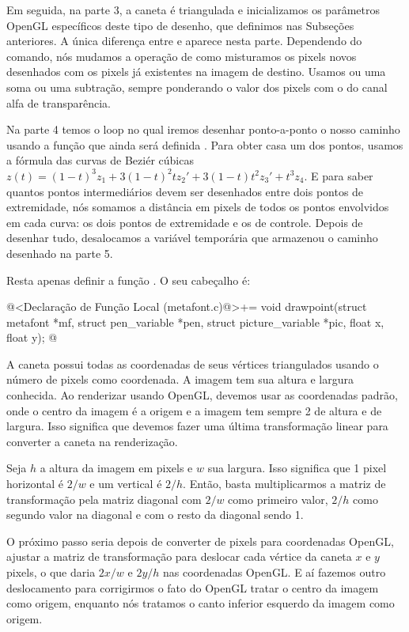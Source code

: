 {Em seguida, na parte 3, a caneta é triangulada e inicializamos os
parâmetros OpenGL específicos deste tipo de desenho, que definimos nas
Subseções anteriores. A única diferença entre 
e  aparece nesta parte. Dependendo do comando, nós
mudamos a operação de como misturamos os pixels novos desenhados com
os pixels já existentes na imagem de destino. Usamos ou uma soma ou
uma subtração, sempre ponderando o valor dos pixels com o do canal
alfa de transparência.

Na parte 4 temos o loop no qual iremos desenhar ponto-a-ponto o nosso
caminho usando a função que ainda será
definida . Para obter casa um dos pontos, usamos
a fórmula das curvas de Beziér cúbicas $z(t) = (1-t)^3z_1 +
3(1-t)^2tz_2' + 3(1-t)t^2z_3'+t^3z_4$. E para saber quantos pontos
intermediários devem ser desenhados entre dois pontos de extremidade,
nós somamos a distância em pixels de todos os pontos envolvidos em
cada curva: os dois pontos de extremidade e os de controle. Depois de
desenhar tudo, desalocamos a variável temporária que armazenou o
caminho desenhado na parte 5.

Resta apenas definir a função . O seu cabeçalho
é:

\iniciocodigo
@<Declaração de Função Local (metafont.c)@>+=
void drawpoint(struct metafont *mf, struct pen_variable *pen,
               struct picture_variable *pic, float x, float y);
@
\fimcodigo

A caneta possui todas as coordenadas de seus vértices triangulados
usando o número de pixels como coordenada. A imagem tem sua altura e
largura conhecida. Ao renderizar usando OpenGL, devemos usar as
coordenadas padrão, onde o centro da imagem é a origem e a imagem tem
sempre 2 de altura e de largura. Isso significa que devemos fazer uma
última transformação linear para converter a caneta na renderização.

Seja $h$ a altura da imagem em pixels e $w$ sua largura. Isso
significa que 1 pixel horizontal é $2/w$ e um vertical é $2/h$. Então,
basta multiplicarmos a matriz de transformação pela matriz diagonal
com $2/w$ como primeiro valor, $2/h$ como segundo valor na diagonal e
com o resto da diagonal sendo 1.

O próximo passo seria depois de converter de pixels para coordenadas
OpenGL, ajustar a matriz de transformação para deslocar cada vértice
da caneta $x$ e $y$ pixels, o que daria $2x/w$ e $2y/h$ nas
coordenadas OpenGL. E aí fazemos outro deslocamento para corrigirmos o
fato do OpenGL tratar o centro da imagem como origem, enquanto nós
tratamos o canto inferior esquerdo da imagem como origem.

}
